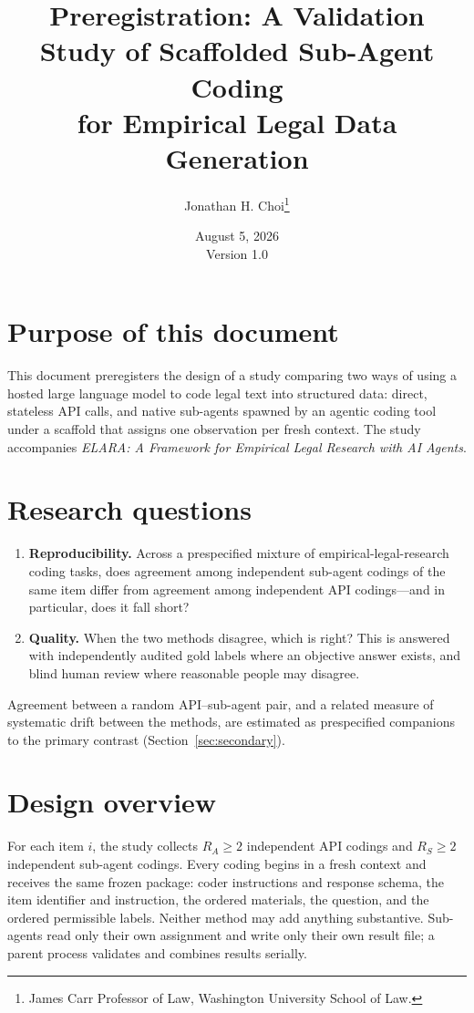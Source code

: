 \documentclass[12pt]{article}
\title{Preregistration: A Validation Study of Scaffolded Sub-Agent Coding\\ for Empirical Legal Data Generation}
\author{Jonathan H. Choi\thanks{James Carr Professor of Law, Washington University School of Law.}}
\date{August 5, 2026 \\[2pt] \normalsize Version 1.0}
\begin{document}
\maketitle

\section{Purpose of this document}

This document preregisters the design of a study comparing two ways of using a hosted large language model to code legal text into structured data: direct, stateless API calls, and native sub-agents spawned by an agentic coding tool under a scaffold that assigns one observation per fresh context. The study accompanies \textit{ELARA: A Framework for Empirical Legal Research with AI Agents}.

\section{Research questions}

\begin{enumerate}
\item \textbf{Reproducibility.} Across a prespecified mixture of empirical-legal-research coding tasks, does agreement among independent sub-agent codings of the same item differ from agreement among independent API codings---and in particular, does it fall short?
\item \textbf{Quality.} When the two methods disagree, which is right? This is answered with independently audited gold labels where an objective answer exists, and blind human review where reasonable people may disagree.
\end{enumerate}

Agreement between a random API--sub-agent pair, and a related measure of systematic drift between the methods, are estimated as prespecified companions to the primary contrast (Section~\ref{sec:secondary}).

\section{Design overview}

For each item $i$, the study collects $R_A \geq 2$ independent API codings and $R_S \geq 2$ independent sub-agent codings. Every coding begins in a fresh context and receives the same frozen package: coder instructions and response schema, the item identifier and instruction, the ordered materials, the question, and the ordered permissible labels. Neither method may add anything substantive. Sub-agents read only their own assignment and write only their own result file; a parent process validates and combines results serially.
\end{document}
